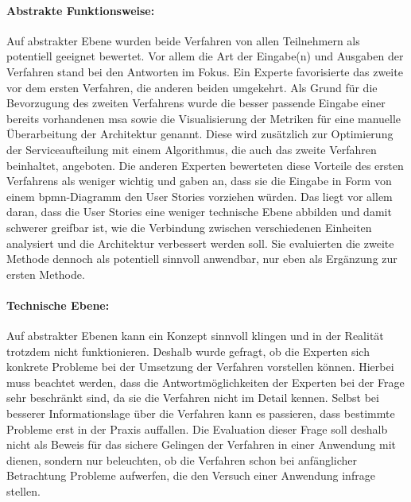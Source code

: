 \paragraph{Abstrakte Funktionsweise:} Auf abstrakter Ebene wurden beide Verfahren von allen Teilnehmern als potentiell geeignet bewertet.
Vor allem die Art der Eingabe(n) und Ausgaben der Verfahren stand bei den Antworten im Fokus.
Ein Experte favorisierte das zweite vor dem ersten Verfahren, die anderen beiden umgekehrt.
Als Grund für die Bevorzugung des  zweiten Verfahrens wurde die besser passende Eingabe einer bereits vorhandenen \gls{msa} sowie die Visualisierung der Metriken für eine manuelle Überarbeitung der Architektur genannt.
Diese wird zusätzlich zur Optimierung der Serviceaufteilung mit einem Algorithmus, die auch das zweite Verfahren beinhaltet, angeboten.
Die anderen Experten bewerteten diese Vorteile des ersten Verfahrens als weniger wichtig und gaben an, dass sie die Eingabe in Form von einem \gls{bpmn}-Diagramm den User Stories vorziehen würden.
Das liegt vor allem daran, dass die User Stories eine weniger technische Ebene abbilden und damit schwerer greifbar ist, wie die Verbindung zwischen verschiedenen Einheiten analysiert und die Architektur verbessert werden soll.
Sie evaluierten die zweite Methode dennoch als potentiell sinnvoll anwendbar, nur eben als Ergänzung zur ersten Methode.

\paragraph{Technische Ebene:} Auf abstrakter Ebenen kann ein Konzept sinnvoll klingen und in der Realität trotzdem nicht funktionieren.
Deshalb wurde gefragt, ob die Experten sich konkrete Probleme bei der Umsetzung der Verfahren vorstellen können.
Hierbei muss beachtet werden, dass die Antwortmöglichkeiten der Experten bei der Frage sehr beschränkt sind, da sie die Verfahren nicht im Detail kennen.
Selbst bei besserer Informationslage über die Verfahren kann es passieren, dass bestimmte Probleme erst in der Praxis auffallen.
Die Evaluation dieser Frage soll deshalb nicht als Beweis für das sichere Gelingen der Verfahren in einer Anwendung mit \jf dienen, sondern nur beleuchten, ob die Verfahren schon bei anfänglicher Betrachtung Probleme aufwerfen, die den Versuch einer Anwendung infrage stellen.

